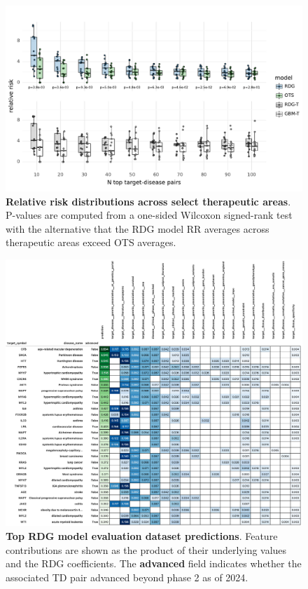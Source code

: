 \documentclass{article}
\begin{document}
\pagebreak

\begin{figure}[H]
  \centering
  \captionsetup{width=.9\linewidth}
  \includegraphics[width=1\textwidth]{relative_risk_dist_across_ta.pdf}
  \caption{
    \textbf{Relative risk distributions across select therapeutic areas}.
    P-values are computed from a one-sided Wilcoxon signed-rank test with the alternative that the RDG model RR averages across therapeutic areas exceed OTS averages.
  }
  \label{fig:relative_risk_dist_across_ta}
\end{figure}

\pagebreak

\begin{figure}[H]
  \centering
  \captionsetup{width=.9\linewidth}
  \includegraphics[width=1\textwidth]{top_evaluation_predictions.png}
  \caption{
    \textbf{Top RDG model evaluation dataset predictions}.
    Feature contributions are shown as the product of their underlying values and the RDG coefficients. The \textbf{advanced} field indicates whether the associated TD pair advanced beyond phase 2 as of 2024.
  }
  \label{fig:top_evaluation_predictions}
\end{figure}
\end{document}
